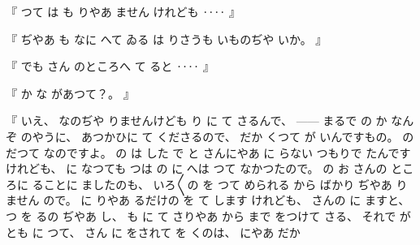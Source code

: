%
『
つて
は
も
りやあ
ません
けれども
‥‥
』

%
『
ぢやあ
も
なに
へて
ゐる
は
りさうも
いものぢや
いか。
』

%
『
でも
さん
のところへ
て
ると
‥‥
』

%
『
か
な
があつて？。
』

%
『
いえ、
%
なのぢや
りませんけども
り
に
て
さるんで、
%
{---}{---}%
まるで
の
か%
なんぞ
のやうに、
%
あつかひに
て
くださるので、
%
だか
くつて
が
いんですもの。
%
の
だつて
なのですよ。
%
の
は
した
で
と
さんにやあ
に
らない
つもりで
たんです
けれども、
%
に
なつても
つは
の
に
へは
つて
なかつたので。
%
の
お
さんの
ところに
ることに
ましたのも、
%
いろ〳〵の
を
つて
められる
から
ばかり
ぢやあ
りません
ので。
%
に
りやあ
るだけの
を
て
します
けれども、
%
さんの
%
に
ますと、
%
つ
を
るの
ぢやあ
し、
%
も
に
て
さりやあ
から
まで
をつけて
さる、
%
それで
が
とも
に
つて、
%
さん
に
をされて
を
%
くのは、
%
にやあ
だか

